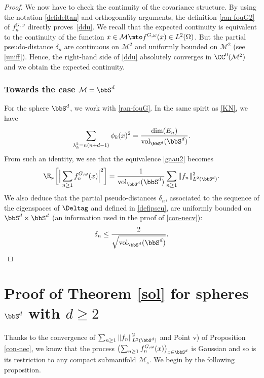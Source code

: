 \begin{proof}
We now have to check the continuity of the covariance structure.
By using the notation \eqref{defideltan} and orthogonality arguments, the definition \eqref{ran-fouG2} of $f_n^{G,\omega}$ directly proves~\eqref{ddu}.
We recall that the expected continuity is equivalent to the continuity of the function $x\in \mathcal{M}\mto f^{G,\omega}(x)\in L^2(\Omega)$.
But the partial pseudo-distance $\delta_n$ are continuous on $\mathcal{M}^2$ and uniformly bounded on $\mathcal{M}^2$ (see \eqref{uniff}).
Hence, the right-hand side of \eqref{ddu} absolutely converges in $\CC^0(\mathcal{M}^2)$ and we obtain the expected continuity.

\subsubsection*{Towards the case $\mathcal{M}=\bbS^d$} For the sphere $\bbS^d$, we work with \eqref{ran-fouG}. In the same spirit as \eqref{KN}, we have
\begin{equation*}
\sum_{\lambda_k^2=n(n+d-1)}\phi_k(x)^2=\frac{\dim(E_n)}{\operatorname{vol}_{\bbS^d}(\bbS^d)}.
\end{equation*}
From such an identity, we see that the equivalence \eqref{gaau2} becomes
\begin{equation*}
\E_{\omega}\biggl[\Big| \sum_{n\geq 1}f_{n}^{G,\omega}(x) \Big|^2 \biggr]=\frac{1}{\operatorname{vol}_{\bbS^d}(\bbS^d)} \sum_{n\geq 1} \|f_n\|_{L^2(\bbS^d)}^2.
\end{equation*}
We also deduce that the partial pseudo-distances $\delta_n$, associated to the sequence of the eigenspaces of $\Deltag$ and defined in \eqref{defipseu}, are uniformly bounded on $\bbS^d\times \bbS^d$ (an information used in the proof of \eqref{con-necv}):
\begin{equation}\label{idd}
\delta_n\leq \frac{2}{\sqrt{\operatorname{vol}_{\bbS^d}(\bbS^d) }}.\qedhere
\end{equation}
\end{proof}

\section{Proof of Theorem \ref{sol} for spheres \texorpdfstring{$\bbS^d$ with $d\geq 2$}{Sd}}\label{preuv-solSd}

Thanks to the convergence of $\sum_{n\geq 1} \left\Vert f_n\right\Vert_{L^2(\bbS^d)}^2$ and Point v) of Proposition \ref{con-nec}, we know that the process $\bigl(\sum_{n\geq 1} f_n^{G,\omega}(x)\bigr)_{x\in \bbS^d}$ is Gaussian and so is its restriction to any compact submanifold $\mathcal{M}_s$.
We begin by the following proposition.

